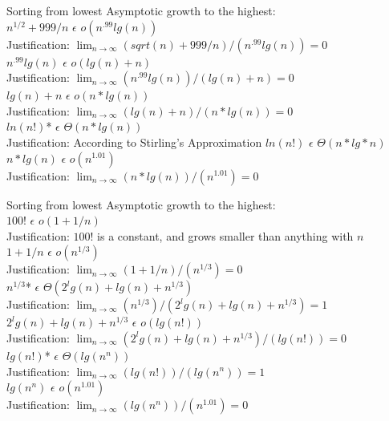\documentclass[12pt]{article}
\newenvironment{question}[2][Question]{\begin{trivlist}
		\item[\hskip \labelsep {\bfseries #1}\hskip \labelsep {\bfseries #2.}]}{\end{trivlist}}
\begin{document}
\begin{question}{3a}
		
		Sorting from lowest Asymptotic growth to the highest:\\
		
		$n^{1/2}+999/n$ $\epsilon$ $o(n^{.99}lg(n))$\\
		Justification: $\lim_{n\to\infty} (sqrt(n) + 999/n)/(n^{.99}lg(n)) = 0$\\
		
		$n^{.99}lg(n)$ $\epsilon$ $o(lg(n)+n)$\\
		Justification: $\lim_{n\to\infty} (n^{.99}lg(n))/(lg(n)+n) = 0$\\
		
		$lg(n)+n$ $\epsilon$ $o(n*lg(n))$ \\
		Justification: $\lim_{n\to\infty} (lg(n)+n)/(n*lg(n)) = 0$\\
				
		$ln(n!)$* $\epsilon$ $\Theta(n*lg(n))$\\
		Justification: According to Stirling's Approximation $ln(n!)$ $\epsilon$ $\Theta(n*lg*n)$\\
		
		$n*lg(n)$ $\epsilon$ $o(n^{1.01})$\\
		Justification: $\lim_{n\to\infty} (n*lg(n))/(n^{1.01}) = 0$\\
	
\end{question}
	
\begin{question}{3b}	
	
	Sorting from lowest Asymptotic growth to the highest:\\
			
	$100!$ $\epsilon$ $o(1+1/n)$\\
	Justification: $100!$ is a constant, and grows smaller than anything with $n$\\
	
	$1+1/n$ $\epsilon$ $o(n^{1/3})$\\
	Justification: $\lim_{n\to\infty} (1+1/n)/(n^{1/3}) = 0$\\
			
	$n^{1/3}$* $\epsilon$ $\Theta(2^lg(n)+lg(n)+n^{1/3})$\\
	Justification: $\lim_{n\to\infty} (n^{1/3})/(2^lg(n)+lg(n)+n^{1/3}) = 1$\\
				
	$2^lg(n)+lg(n)+n^{1/3}$ $\epsilon$ $o(lg(n!))$\\
	Justification: $\lim_{n\to\infty} (2^lg(n)+lg(n)+n^{1/3})/(lg(n!)) = 0$\\
	
	$lg(n!)$* $\epsilon$ $\Theta(lg(n^n))$ \\
	Justification: $\lim_{n\to\infty} (lg(n!))/(lg(n^n)) = 1$\\
		
	$lg(n^n)$ $\epsilon$ $o(n^{1.01})$\\
	Justification: $\lim_{n\to\infty} (lg(n^n))/(n^{1.01}) = 0$\\
	
			\end{question}
	
\end{document}
